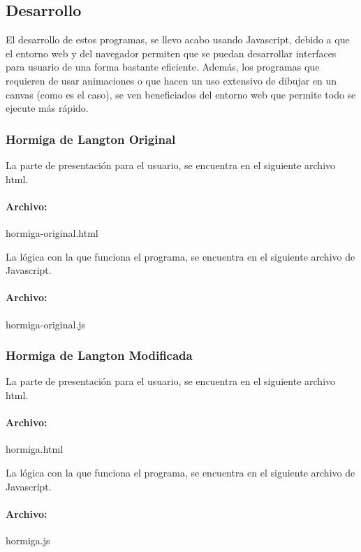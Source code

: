 \subsection{Desarrollo}
	
	El desarrollo de estos programas, se llevo acabo usando Javascript, debido a que el entorno web y del navegador permiten que se puedan desarrollar interfaces para usuario de una forma bastante eficiente. Además, los programas que requieren de usar animaciones o que hacen un uso extensivo de dibujar en un canvas (como es el caso), se ven beneficiados del entorno web que permite todo se ejecute más rápido.

	\subsubsection{Hormiga de Langton Original}
		La parte de presentación para el usuario, se encuentra en el siguiente archivo html.
		
		\paragraph{Archivo: }  hormiga-original.html
		

		La lógica con la que funciona el programa, se encuentra en el siguiente archivo de Javascript.
		
		\paragraph{Archivo: }  hormiga-original.js
		

	\subsubsection{Hormiga de Langton Modificada}
		La parte de presentación para el usuario, se encuentra en el siguiente archivo html.

		\paragraph{Archivo: }  hormiga.html
		

		La lógica con la que funciona el programa, se encuentra en el siguiente archivo de Javascript.
		
		\paragraph{Archivo: }  hormiga.js
		